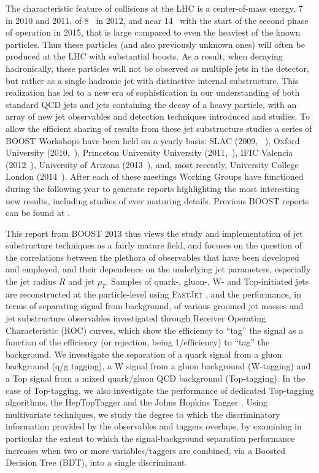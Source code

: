 The characteristic feature of collisions at the LHC is a center-of-mass energy, 7~\tev{} in 2010 and 2011, 
of 8~\tev{} in 2012, and near 14~\tev{} with the start of the second phase of operation in 2015, that is large
compared to even the heaviest of the known particles.  Thus these particles (and also previously unknown ones)
will often be produced at the LHC with
substantial boosts.  As a result, when decaying hadronically, these particles will not be observed as multiple jets in the detector, but rather
as a single hadronic jet with distinctive internal substructure.  This realization has led to a new era of sophistication
in our understanding of  both standard QCD jets and jets containing the decay of a heavy particle, with an array
of new jet observables and detection techniques introduced and studies.  To allow the efficient sharing of 
results from these jet substructure studies a series of BOOST Workshops have been held on a yearly basis:
SLAC (2009, ~\cite{Boost:2009xx}), 
Oxford University (2010,~\cite{Boost:2010xx}), Princeton 
University University (2011,~\cite{Boost:2011xx}),  IFIC Valencia (2012~\cite{Boost:2012xx}), 
University of Arizona (2013~\cite{Boost:2013xx}), and, most recently, University College London (2014~\cite{Boost:2014xx}).
After each of these meetings Working Groups have functioned during the following year to generate reports
highlighting the most interesting new results, including studies of ever maturing details.   Previous BOOST reports
can be found at \cite{Abdesselam:2010pt,Altheimer:2012mn,Altheimer:2013yza}.

This report from BOOST 2013 thus views the study and implementation of jet substructure techniques as a fairly
mature field, and focuses on the question of the correlations between the plethora of observables that have been developed 
and employed, and their dependence on the underlying jet parameters, especially the jet radius $R$ and jet $p_T$. Samples of quark-, gluon-, W- and Top-initiated jets are reconstructed at the particle-level using \textsc{FastJet} \cite{Cacciari:2011ma}, and the performance, in terms of separating signal from background, of various groomed jet masses and jet substructure observables investigated through Receiver Operating Characteristic (ROC) curves, which show the efficiency to ``tag'' the signal as a function of the efficiency (or rejection, being 1/efficiency) to ``tag'' the background. We investigate the separation of a quark signal from a gluon background (q/g tagging), a W signal from a gluon background (W-tagging) and a Top signal from a mixed quark/gluon QCD background (Top-tagging). In the case of Top-tagging, we also investigate the performance of dedicated Top-tagging algorithms, the HepTopTagger \cite{Plehn:2010st} and the Johns Hopkins Tagger \cite{Kaplan:2008ie}. Using multivariate techniques, we study the degree to which the discriminatory information provided by the observables and taggers overlaps, by examining in particular the extent to which the signal-background separation performance increases when two or more variables/taggers are combined, via a Boosted Decision Tree (BDT), into a single discriminant. 

